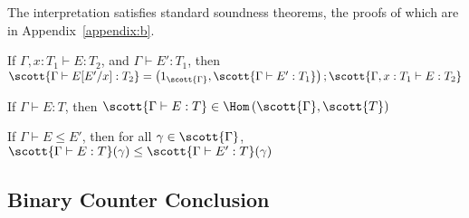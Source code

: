 The interpretation satisfies standard soundness theorems, the 
proofs of which 
are in Appendix~\ref{appendix:b}.%


\begin{theorem}[Compositionality]
\label{thm:sem-subst}
If $\Gamma, x : T_1 \vdash E : T_2$, and $\Gamma \vdash E' : T_1$, then $\scott{\Gamma \vdash E[E'/x] : T_2} =  \left(1_{\scott{\Gamma}},\scott{\Gamma \vdash E' : T_1}\right) ; \scott{\Gamma, x:T_1 \vdash E : T_2}$
\end{theorem}


\begin{theorem}
\label{thm:term-soundness}
If $\Gamma \vdash E : T$, then $\scott{\Gamma \vdash E : T} \in \Hom\left(\scott{\Gamma},\scott{T}\right)$
\end{theorem}


\begin{theorem}
\label{thm:soundness-inequality}
If $\Gamma \vdash E \leq E'$, then for all $\gamma \in \scott{\Gamma}$, $\scott{\Gamma \vdash E : T}(\gamma) \leq \scott{\Gamma \vdash E' : T}(\gamma)$
\end{theorem}

\subsection{Binary Counter Conclusion}

